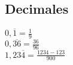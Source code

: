 \subsection{Decimales}
$ 0,\overline{1} = \frac{1}{9} $\\
$ 0,\overline{36} = \frac{36}{96} $\\
$ 1,23\overline{4} = \frac{1234 -123}{900} $\\